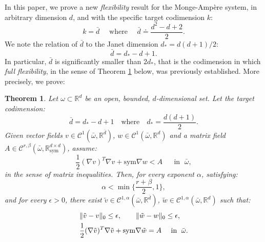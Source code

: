 \documentclass[reqno,twoside,11pt]{amsart}
\newcommand{\sym}{\mathrm{sym}}
\newcommand{\R}{\mathbb{R}}
\numberwithin{equation}{section}
\theoremstyle{plain}
\newtheorem{theorem}{Theorem}[section]
\theoremstyle{definition}
\begin{document}
In this paper, we prove a new {\em flexibility} result
for the Monge-Amp\`ere system, in arbitrary dimension $d$, and with the
specific target codimension $k$:
$$ k = \bar d \quad \mbox{ where } \quad \bar d\doteq \frac{d^2-d+2}{2}.$$
We note the relation of $\bar d$ to the Janet dimension $d_*= d(d+1)/2$:
$$\bar d= d_*-d+1.$$
In particular, $\bar d$ is significantly smaller than $2d_*$, 
that is the codimension in which {\em full flexibility}, in the sense of Theorem \ref{th_final} below, was previously established.
More precisely, we prove:
\begin{theorem}\label{th_final}
Let $\omega\subset\R^d$ be an open, bounded, $d$-dimensional
set. Let  the target codimension:
$$\bar d = d_*-d+1 \quad \mbox{where} \quad d_*=\frac{d(d+1)}{2}.$$
Given vector fields $v\in\mathcal{C}^1(\bar\omega,\R^{\bar d})$,
$w\in\mathcal{C}^1(\bar\omega,\R^{d})$
and a matrix field $A\in\mathcal{C}^{r,\beta}(\bar\omega,\R^{d\times d}_\sym)$,
assume:
\begin{equation*}
\frac{1}{2}(\nabla v)^T\nabla v + \sym\nabla
w < A \quad \; \mbox{ in } \; \bar\omega,
\end{equation*}
in the sense of matrix inequalities. Then, for every exponent $\alpha$, satisfying:
\begin{equation}\label{VKrange} 
\alpha<\min\Big\{\frac{r+\beta}{2}, 1 \Big\},
\end{equation}
and for every $\epsilon>0$,  there exist $\tilde v\in\mathcal{C}^{1,\alpha}(\bar\omega,\R^{\bar d})$,
$\tilde w\in\mathcal{C}^{1,\alpha}(\bar\omega,\R^{d})$ such that:
\begin{align*}
& \|\tilde v - v\|_0\leq \epsilon, \qquad \|\tilde w - w\|_0\leq \epsilon,
\nonumber \vspace{1mm}\\ 
& \frac{1}{2}(\nabla \tilde v)^T\nabla \tilde v + \sym\nabla
\tilde w = A \quad \mbox{ in }\;\bar\omega. \nonumber
\end{align*}
\end{theorem}

\smallskip
\end{document}
